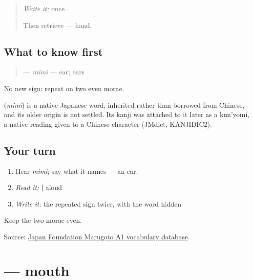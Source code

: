 \label{lesson:JA-C11-mimi}



\begin{quote}
\emph{Write it:} \textbf{} once

Then retrieve \textbf{} — hand.
\end{quote}

\subsection*{What to know first}
\begin{quote}
\textbf{} — \emph{mimi} — ear; ears
\end{quote}

No new sign: repeat \textbf{} on two even morae.

\begin{cousinweb}
\textbf{} (\emph{mimi}) is a native Japanese word, inherited rather than borrowed from Chinese, and its older origin is not settled. Its kanji was attached to it later as a kun'yomi, a native reading given to a Chinese character (JMdict, KANJIDIC2).
\end{cousinweb}

\subsection*{Your turn}
\begin{enumerate}
\raggedright
  \item Hear \emph{mimi}; say what it names — an ear.
  \item \emph{Read it:} \textbf{ | } aloud
  \item \emph{Write it:} the repeated sign twice, with the word hidden
\end{enumerate}

\begin{tcolorbox}[breakable,colback=teal!4,colframe=teal!35!black,title={Before you move on}]
Keep the two morae even.

Source: \href{https://words.marugotoweb.jp/}{Japan Foundation Marugoto A1 vocabulary database}.
\end{tcolorbox}
\section[\texorpdfstring{\ja{口} (kuchi)}{口 (kuchi)}]{ — mouth}

\label{lesson:JA-C11-kuchi}



